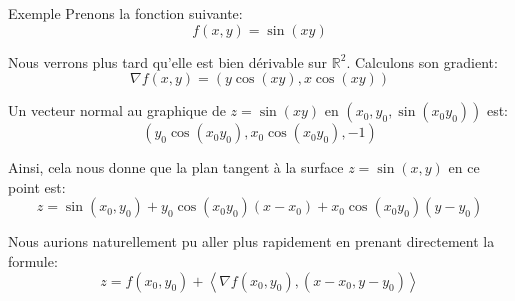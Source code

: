 \documentclass[a4paper]{article}
\begin{document}
\begin{parag}{Exemple}
    Prenons la fonction suivante:
    \[f\left(x, y\right) = \sin\left(xy\right)\]

    Nous verrons plus tard qu'elle est bien dérivable sur $\mathbb{R}^2$. Calculons son gradient: 
    \[\nabla f\left(x, y\right) = \left(y \cos\left(xy\right), x \cos\left(xy\right)\right)\]
    
    Un vecteur normal au graphique de $z = \sin\left(xy\right)$ en $\left(x_0, y_0, \sin\left(x_0 y_0\right)\right)$ est: 
    \[\left(y_0 \cos\left(x_0 y_0\right), x_0 \cos\left(x_0 y_0\right), - 1\right)\]
    
    Ainsi, cela nous donne que la plan tangent à la surface $z = \sin\left(x, y\right)$ en ce point est: 
    \[z = \sin\left(x_0, y_0\right) + y_0 \cos\left(x_0 y_0\right)\left(x - x_0\right) + x_0 \cos\left(x_0 y_0\right)\left(y - y_0\right)\]

    Nous aurions naturellement pu aller plus rapidement en prenant directement la formule: 
    \[z = f\left(x_0, y_0\right) + \left<\nabla f\left(x_0, y_0\right), \left(x - x_0, y - y_0\right)\right>\]
    
    
\end{parag}
\end{document}
